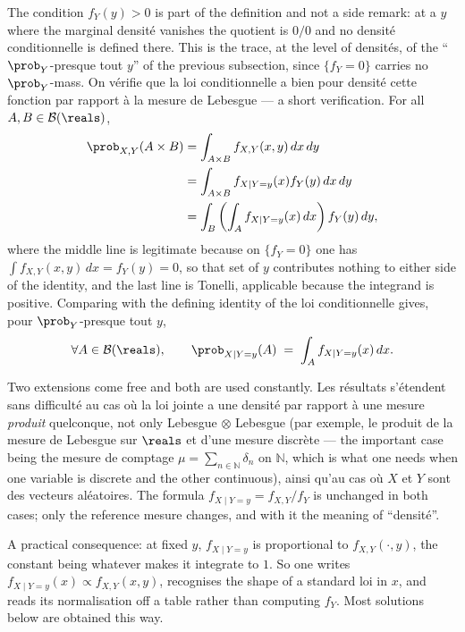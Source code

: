 The condition $f_{Y}(y) > 0$ is part of the definition and not a side remark: at a
$y$ where the marginal densité vanishes the quotient is $0/0$ and no densité
conditionnelle is defined there. This is the trace, at the level of densités, of the
``$\prob_{Y}$-presque tout $y$'' of the previous subsection, since
$\{f_{Y} = 0\}$ carries no $\prob_{Y}$-mass. On vérifie que la loi conditionnelle a
bien pour densité cette fonction par rapport à la mesure de Lebesgue --- a short
verification. For all $A, B \in \mathcal{B}(\reals)$,
\begin{align*}
  \prob_{X,Y}(A \times B)
  &= \int_{A \times B} f_{X,Y}(x,y) \, dx \, dy \\
  &= \int_{A \times B} f_{X \mid Y = y}(x) f_{Y}(y) \, dx \, dy \\
  &= \int_{B} \left( \int_{A} f_{X \mid Y = y}(x) \, dx \right) f_{Y}(y) \, dy ,
\end{align*}
where the middle line is legitimate because on $\{f_{Y} = 0\}$ one has
$\int f_{X,Y}(x,y) \, dx = f_{Y}(y) = 0$, so that set of $y$ contributes nothing
to either side of the identity, and the last line is Tonelli, applicable
because the integrand is positive. Comparing with the defining identity of the
loi conditionnelle gives, pour $\prob_{Y}$-presque tout $y$,
\[
  \forall A \in \mathcal{B}(\reals), \qquad
  \prob_{X \mid Y = y}(A) \;=\; \int_{A} f_{X \mid Y = y}(x) \, dx .
\]

\begin{remark}
  Two extensions come free and both are used constantly. Les résultats s'étendent
  sans difficulté au cas où la loi jointe a une densité par rapport à une mesure
  \emph{produit} quelconque, not only Lebesgue$\,\otimes\,$Lebesgue (par exemple, le
  produit de la mesure de Lebesgue sur $\reals$ et d'une mesure discrète --- the
  important case being the mesure de comptage
  $\mu = \sum_{n \in \mathbb{N}} \delta_{n}$ on $\mathbb{N}$, which is what one
  needs when one variable is discrete and the other continuous), ainsi qu'au cas où
  $X$ et $Y$ sont des vecteurs aléatoires. The formula
  $f_{X \mid Y = y} = f_{X,Y}/f_{Y}$ is unchanged in both cases; only the reference
  mesure changes, and with it the meaning of ``densité''.
\end{remark}

\begin{remark}
  A practical consequence: at fixed $y$, $f_{X \mid Y = y}$ is proportional to
  $f_{X,Y}(\cdot,y)$, the constant being whatever makes it integrate to $1$. So
  one writes $f_{X \mid Y = y}(x) \propto f_{X,Y}(x,y)$, recognises the shape of a
  standard loi in $x$, and reads its normalisation off a table rather than
  computing $f_{Y}$. Most solutions below are obtained this way.
\end{remark}

